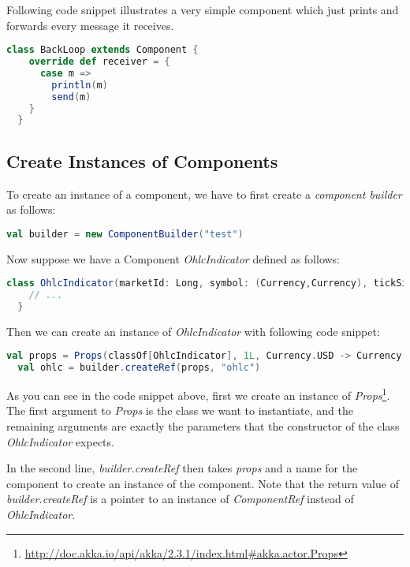 Following code snippet illustrates a very simple component which just prints and forwards every message it receives.

\begin{lstlisting}[language=Scala]
  class BackLoop extends Component {
    override def receiver = {
      case m =>
        println(m)
        send(m)
    }
  }
\end{lstlisting}

\subsection{Create Instances of Components}

To create an instance of a component, we have to first create a \emph{component builder} as follows:

\begin{lstlisting}[language=Scala]
val builder = new ComponentBuilder("test")
\end{lstlisting}

Now suppose we have a Component \emph{OhlcIndicator} defined as follows:

\begin{lstlisting}[language=Scala]
  class OhlcIndicator(marketId: Long, symbol: (Currency,Currency), tickSizeMillis: Long) extends Component   {
    // ...
  }
\end{lstlisting}

Then we can create an instance of \emph{OhlcIndicator} with following code snippet:

\begin{lstlisting}[language=Scala]
  val props = Props(classOf[OhlcIndicator], 1L, Currency.USD -> Currency.CHF, 50)
  val ohlc = builder.createRef(props, "ohlc")
\end{lstlisting}

As you can see in the code snippet above, first we create an instance of \emph{Props}\footnote{\url{http://doc.akka.io/api/akka/2.3.1/index.html\#akka.actor.Props}}. The first argument to \emph{Props} is the class we want to instantiate, and the remaining arguments are exactly the parameters that the constructor of the class \emph{OhlcIndicator} expects.

In the second line, \emph{builder.createRef} then takes \emph{props} and a name for the component to create an instance of the component. Note that the return value of \emph{builder.createRef} is a pointer to an instance of \emph{ComponentRef} instead of \emph{OhlcIndicator}.

